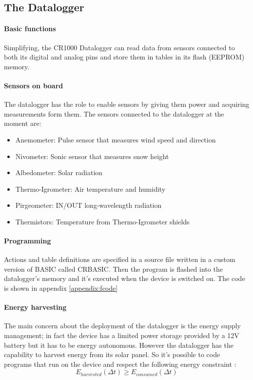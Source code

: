 \subsection{The Datalogger}
\paragraph{Basic functions \cite{cmp1}}
Simplifying, the CR1000 Datalogger can read data from sensors connected to both its digital and analog pins and store them in tables in its flash (EEPROM) memory.
\paragraph{Sensors on board \cite{avv1}}
The datalogger has the role to enable sensors by giving them power and acquiring measurements form them. The sensors connected to the datalogger at the moment are:
\begin{itemize}
    \item Anemometer: Pulse sensor that measures wind speed and direction
    \item Nivometer: Sonic sensor that measures snow height
    \item Albedometer: Solar radiation
    \item Thermo-Igrometer: Air temperature and humidity
    \item Pirgeometer: IN/OUT long-wavelength radiation
    \item Thermistors: Temperature from Thermo-Igrometer shields
\end{itemize}
\paragraph{Programming}
Actions and table definitions are specified in a source file written in a custom version of BASIC called CRBASIC. Then the program is flashed into the datalogger's memory and it's executed when the device is switched on. The code is shown in appendix \ref{appendix:fcode}
\paragraph{Energy harvesting}
The main concern about the deployment of the datalogger is the energy supply management; in fact the device has a limited power storage provided by a 12V battery but it has to be energy autonomous. However the datalogger has the capability to harvest energy from its solar panel. So it's possible to code programs that run on the device and respect the following energy constraint \cite{avv1}:
\begin{equation}
    E_{harvested}(\Delta t) \geq E_{consumed}(\Delta t)
\end{equation}